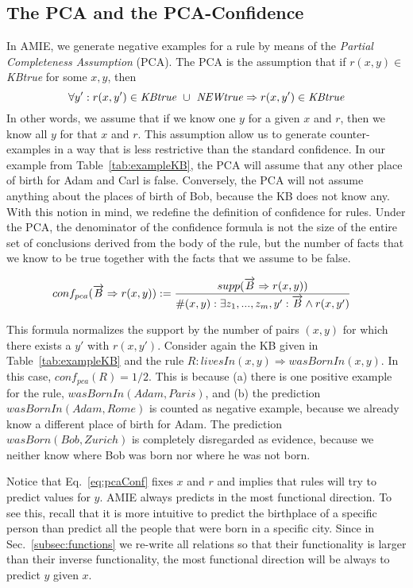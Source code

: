 \subsection{The PCA and the PCA-Confidence}\label{subsubsec:pcaConf}

In AMIE, we generate negative examples for a rule by means of the \emph{Partial Completeness Assumption} (PCA).
The PCA is the assumption that if $r(x,y) \in$ \emph{KBtrue} for some $x,y$, then
\[\forall y': r(x,y') \in \mbox{\emph{KBtrue}}\ \cup\ \mbox{\emph{NEWtrue}} \Rightarrow r(x,y') \in \mbox{\emph{KBtrue}}\]
In other words, we assume that if we know one $y$ for a given $x$ and $r$, then we know all $y$ for that $x$ and $r$.
This assumption allow us to generate counter-examples in a way that is less restrictive than the standard confidence.
In our example from Table~\ref{tab:exampleKB}, the PCA will assume that any other place of birth for
Adam and Carl is false. Conversely, the PCA will not assume anything about the places of birth of Bob, because
the KB does not know any.
With this notion in mind, we redefine the definition of confidence for rules. Under the PCA,
the denominator of the confidence formula is not the size of the entire set of conclusions
derived from the body of the rule,
but the number of facts that we know to be true together with the facts that we assume to be false.

\begin{small}
\begin{equation} \label{eq:pcaConf}
 \hspace*{-2ex}
conf_{pca}(\vec{B} \Rightarrow r(x,y)) := \frac{supp(\vec{B} \Rightarrow r(x,y))}{\#(x,y): \exists z_1,...,z_m,y': \vec{B} \wedge r(x,y')}
\end{equation}
\end{small}
% 
This formula normalizes the support by the number of pairs $(x,y)$ for which there exists a $y'$ with $r(x,y')$.
Consider again the KB given in Table~\ref{tab:exampleKB} and the rule $R: livesIn(x,y)\Rightarrow wasBornIn(x,y)$. In this case, $conf_{pca}(R)=1/2$. This is because (a) there is one positive example for the rule, $wasBornIn(Adam, Paris)$, and (b) the prediction $wasBornIn(Adam, Rome)$ is counted as negative example, because we already know a different place of birth for Adam. The prediction $wasBorn(Bob,Zurich)$ is completely disregarded as evidence, because we neither know where Bob was born nor where he was not born.

Notice that Eq.~\ref{eq:pcaConf} fixes $x$ and $r$ and implies that rules will try to predict values for $y$.
AMIE always predicts in the most functional direction. To see this, recall that
it is more intuitive to predict the birthplace of a specific person
than predict all the people that were born in a specific city.
Since in Sec.~\ref{subsec:functions} we re-write all relations so that their functionality
is larger than their inverse functionality, the most functional direction
will be always to predict $y$ given $x$.

